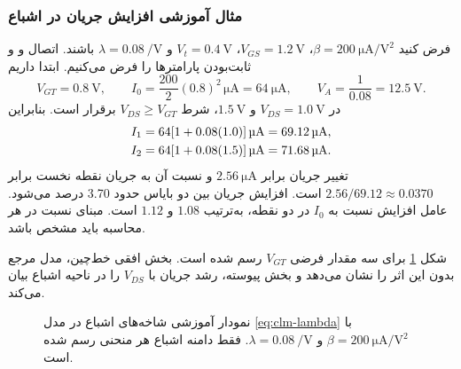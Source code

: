 \subsubsection*{مثال آموزشی افزایش جریان در اشباع}
فرض کنید \(\beta=\qty{200}{\micro\ampere\per\volt\squared}\)،
\(V_{GS}=\qty{1.2}{\volt}\)، \(V_t=\qty{0.4}{\volt}\) و
\(\lambda=\qty{0.08}{\per\volt}\) باشند. اتصال  و
 و ثابت‌بودن پارامترها را فرض می‌کنیم. ابتدا داریم
\begin{equation*}
 V_{GT}=\qty{0.8}{\volt},\qquad
 I_0=\frac{200}{2}(0.8)^2\,\unit{\micro\ampere}
 =\qty{64}{\micro\ampere},\qquad
 V_A=\frac{1}{0.08}=\qty{12.5}{\volt}.
\end{equation*}
در \(V_{DS}=\qty{1.0}{\volt}\) و \(\qty{1.5}{\volt}\)، شرط
\(V_{DS}\ge V_{GT}\) برقرار است. بنابراین
\begin{align}
 I_1&=64[1+0.08(1.0)]\,\unit{\micro\ampere}
 =\qty{69.12}{\micro\ampere},\notag\\
 I_2&=64[1+0.08(1.5)]\,\unit{\micro\ampere}
 =\qty{71.68}{\micro\ampere}.
 \label{eq:clm-example-currents}
\end{align}
تغییر جریان برابر \(\qty{2.56}{\micro\ampere}\) و نسبت آن به جریان
نقطه نخست برابر \(2.56/69.12\approx0.0370\) است. افزایش جریان بین دو
بایاس حدود \num{3.70} درصد می‌شود. عامل افزایش نسبت به \(I_0\) در دو
نقطه، به‌ترتیب \(1.08\) و \(1.12\) است. مبنای نسبت در هر محاسبه باید
مشخص باشد.

شکل \ref{fig:clm-curves} برای سه مقدار فرضی \(V_{GT}\) رسم شده است.
بخش افقی خط‌چین، مدل مرجع بدون این اثر را نشان می‌دهد و بخش پیوسته،
رشد جریان با \(V_{DS}\) را در ناحیه اشباع بیان می‌کند.
\begin{figure}[!htbp]
\centering
\begin{latin}
\PersianMathDigits
{}
\end{latin}
\caption{نمودار آموزشی شاخه‌های اشباع در مدل \eqref{eq:clm-lambda} با
\(\beta=\qty{200}{\micro\ampere\per\volt\squared}\) و
\(\lambda=\qty{0.08}{\per\volt}\). فقط دامنه اشباع هر منحنی رسم شده است.}
\label{fig:clm-curves}
\end{figure}

